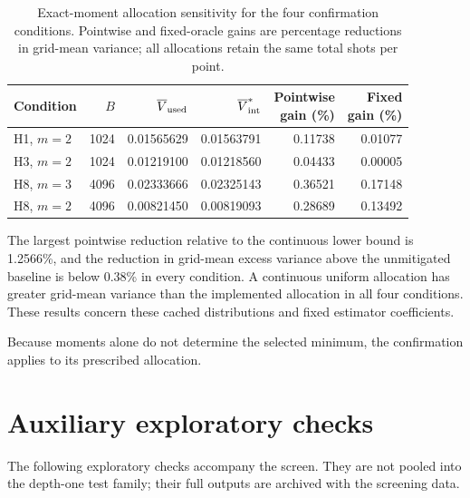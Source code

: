 \begin{table}[htbp]\centering\small
\caption{Exact-moment allocation sensitivity for the four confirmation conditions. Pointwise and fixed-oracle gains are percentage reductions in grid-mean variance; all allocations retain the same total shots per point.}
\label{tab:allocation_sensitivity}
\setlength{\tabcolsep}{5pt}
\begin{tabular}{lrrrrr}\hline
Condition & $B$ & $\overline V_{\rm used}$ & $\overline V_{\rm int}^*$ & \shortstack{Pointwise\\gain (\%)} & \shortstack{Fixed\\gain (\%)}\\\hline
H1, $m=2$ & 1024 & 0.01565629 & 0.01563791 & 0.11738 & 0.01077\\
H3, $m=2$ & 1024 & 0.01219100 & 0.01218560 & 0.04433 & 0.00005\\
H8, $m=3$ & 4096 & 0.02333666 & 0.02325143 & 0.36521 & 0.17148\\
H8, $m=2$ & 4096 & 0.00821450 & 0.00819093 & 0.28689 & 0.13492\\
\hline\end{tabular}\end{table}

The largest pointwise reduction relative to the continuous lower bound is 1.2566\%, and the reduction in grid-mean excess variance above the unmitigated baseline is below 0.38\% in every condition. A continuous uniform allocation has greater grid-mean variance than the implemented allocation in all four conditions. These results concern these cached distributions and fixed estimator coefficients.

Because moments alone do not determine the selected minimum, the confirmation applies to its prescribed allocation.

\section{Auxiliary exploratory checks}\label{app:auxiliary}
The following exploratory checks accompany the screen. They are not pooled into the depth-one test family; their full outputs are archived with the screening data.

